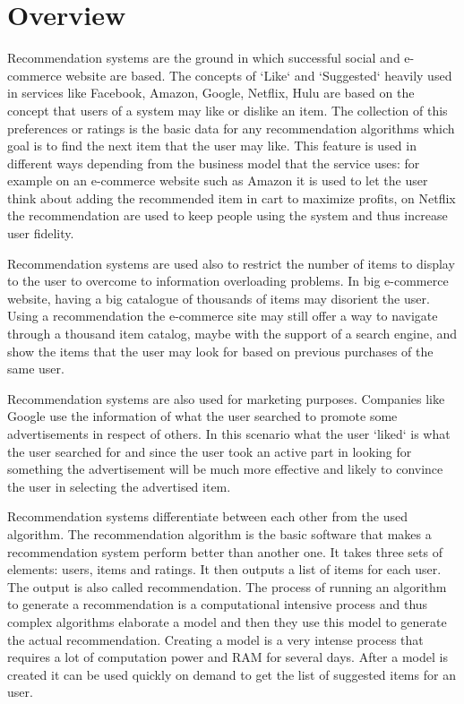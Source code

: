 \chapter{Overview}
\label{chapter:<overview>}

\acresetall

Recommendation systems are the ground in which successful social and e-commerce website are based. The concepts of `Like` and `Suggested` heavily used in services like Facebook, Amazon, Google, Netflix, Hulu are based on the concept that users of a system may like or dislike an item. The collection of this preferences or ratings is the basic data for any recommendation algorithms which goal is to find the next item that the user may like. This feature is used in different ways depending from the business model that the service uses: for example on an e-commerce website such as Amazon it is used to let the user think about adding the recommended item in cart to maximize profits, on Netflix the recommendation are used to keep people using the system and thus increase user fidelity.

Recommendation systems are used also to restrict the number of items to display to the user to overcome to information overloading problems. In big e-commerce website, having a big catalogue of thousands of items may disorient the user. Using a recommendation the e-commerce site may still offer a way to navigate through a thousand item catalog, maybe with the support of a search engine, and show the items that the user may look for based on previous purchases of the same user.

Recommendation systems are also used for marketing purposes. Companies like Google use the information of what the user searched to promote some advertisements in respect of others. In this scenario what the user `liked` is what the user searched for and since the user took an active part in looking for something the advertisement will be much more effective and likely to convince the user in selecting the advertised item.

Recommendation systems differentiate between each other from the used algorithm. The recommendation algorithm is the basic software that makes a recommendation system perform better than another one. It takes three sets of elements: users, items and ratings. It then outputs a list of items for each user. The output is also called recommendation. The process of running an algorithm to generate a recommendation is a computational intensive process and thus complex algorithms elaborate a model and then they use this model to generate the actual recommendation. Creating a model is a very intense process that requires a lot of computation power and \ac{RAM} for several days. After a model is created it can be used quickly on demand to get the list of suggested items for an user.

